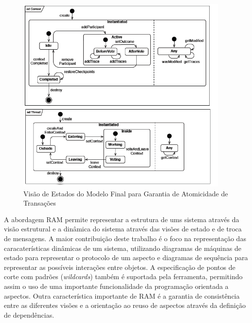 \begin{landscape}
\begin{figure}
	\centering
	\includegraphics[width=400px]{img/p87_state_final_model.png}
	\caption{Visão de Estados do Modelo Final para Garantia de Atomicidade de
	Transações}\label{fig:p87_state_final_model}
\end{figure}
\end{landscape}

A abordagem RAM permite representar a estrutura de ums sistema através da visão estrutural e a dinâmica do sistema através das visões de estado
e de troca de mensagens. A maior contribuição deste trabalho é o foco na representação das caracaterísticas dinâmicas de um sistema, utilizando
diagramas de máquinas de estado para representar o protocolo de um aspecto e diagramas de sequência para representar as possíveis interações entre
objetos. A especificação de pontos de corte com padrões (\textit{wildcards}) também é suportada pela ferramenta, permitindo assim o uso de uma 
importante funcionalidade da programação orientada a aspectos. Outra característica importante de RAM é a garantia de consistência entre as
diferentes visões e a orientação ao reuso de aspectos através da definição de dependências. 

